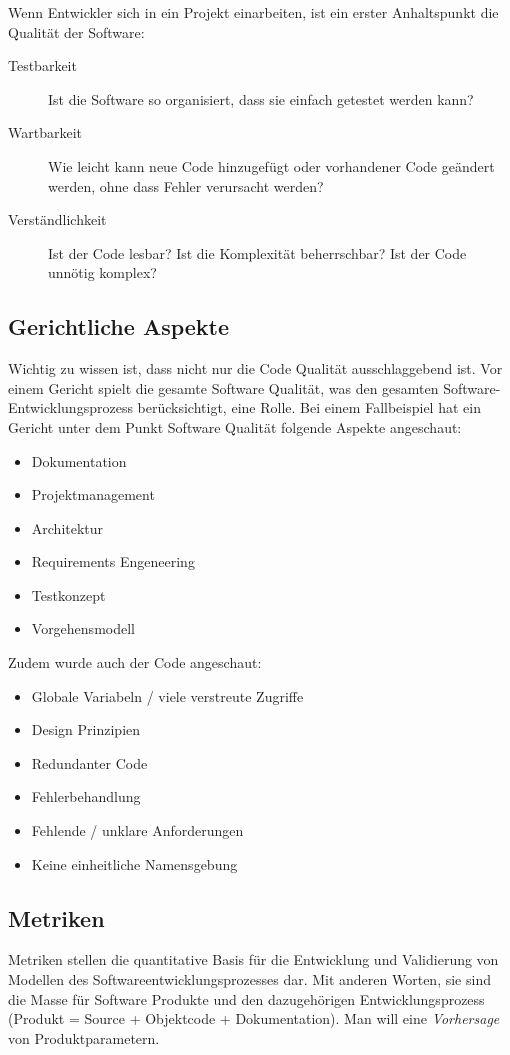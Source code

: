 Wenn Entwickler sich in ein Projekt einarbeiten, ist ein erster Anhaltspunkt die Qualität der Software:
\begin{description}
	\item[Testbarkeit] Ist die Software so organisiert, dass sie einfach getestet werden kann?
	
	\item[Wartbarkeit] Wie leicht kann neue Code hinzugefügt oder vorhandener Code geändert werden, ohne dass Fehler verursacht werden?
	
	\item[Verständlichkeit] Ist der Code lesbar? Ist die Komplexität beherrschbar? Ist der Code unnötig komplex?
\end{description}

\subsection{Gerichtliche Aspekte}
Wichtig zu wissen ist, dass nicht nur die Code Qualität ausschlaggebend ist. Vor einem Gericht spielt die gesamte Software Qualität, was den gesamten Software-Entwicklungsprozess berücksichtigt, eine Rolle. Bei einem Fallbeispiel hat ein Gericht unter dem Punkt Software Qualität folgende Aspekte angeschaut:

\begin{itemize}
	\item Dokumentation
	\item Projektmanagement
	\item Architektur
	\item Requirements Engeneering
	\item Testkonzept
	\item Vorgehensmodell
\end{itemize}

Zudem wurde auch der Code angeschaut:
\begin{itemize}
	\item Globale Variabeln / viele verstreute Zugriffe
	\item Design Prinzipien
	\item Redundanter Code
	\item Fehlerbehandlung
	\item Fehlende / unklare Anforderungen
	\item Keine einheitliche Namensgebung
\end{itemize}

\subsection{Metriken}
Metriken stellen die quantitative Basis für die Entwicklung und Validierung von Modellen des Softwareentwicklungsprozesses dar. Mit anderen Worten, sie sind die Masse für Software Produkte und den dazugehörigen Entwicklungsprozess (Produkt = Source + Objektcode + Dokumentation). Man will eine \emph{Vorhersage} von Produktparametern.

